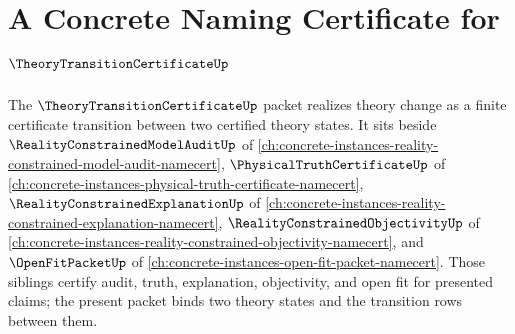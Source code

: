 \chapter{A Concrete Naming Certificate for $\TheoryTransitionCertificateUp$}
\label{ch:concrete-instances-theory-transition-certificate-namecert}

The $\TheoryTransitionCertificateUp$ packet realizes theory change as a finite certificate transition between two certified theory states. It sits beside $\RealityConstrainedModelAuditUp$ of \autoref{ch:concrete-instances-reality-constrained-model-audit-namecert}, $\PhysicalTruthCertificateUp$ of \autoref{ch:concrete-instances-physical-truth-certificate-namecert}, $\RealityConstrainedExplanationUp$ of \autoref{ch:concrete-instances-reality-constrained-explanation-namecert}, $\RealityConstrainedObjectivityUp$ of \autoref{ch:concrete-instances-reality-constrained-objectivity-namecert}, and $\OpenFitPacketUp$ of \autoref{ch:concrete-instances-open-fit-packet-namecert}. Those siblings certify audit, truth, explanation, objectivity, and open fit for presented claims; the present packet binds two theory states and the transition rows between them.

